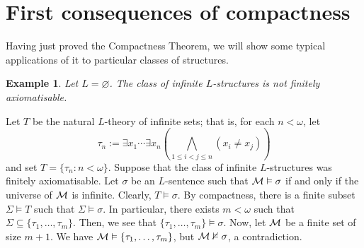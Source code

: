 \documentclass[10pt]{article}
\makeatletter
\theoremstyle{newstyle}
\newtheorem{exmp}[thm]{Example}
\newenvironment{pf}[1][\proofname]{\par
  \pushQED{\qed}%
  \normalfont \topsep0\p@\relax
  \trivlist
  \item[\hskip\labelsep\scshape
  #1\@addpunct{.}]\ignorespaces
}{%
  \popQED\endtrivlist\@endpefalse
}
\makeatother
\begin{document}
\newpage
\section{First consequences of compactness}

Having just proved the Compactness Theorem, we will show some typical applications of it to 
particular classes of structures. 

\begin{exmp}
Let $L = \varnothing$. The class of infinite $L$-structures is not finitely axiomatisable. 
\end{exmp}
\begin{pf}
Let $T$ be the natural $L$-theory of infinite sets; that is, for each $n < \omega$, let 
\[ \tau_n := \exists x_1 \cdots \exists x_n \left( \bigwedge_{1 \leq i < j \leq n} (x_i \neq x_j) 
\right) \] 
and set $T = \{\tau_n : n < \omega\}$. Suppose that the class of infinite $L$-structures 
was finitely axiomatisable. Let $\sigma$ be an $L$-sentence such that ${\cal M} \vDash \sigma$ 
if and only if the universe of ${\cal M}$ is infinite. Clearly, $T \vDash \sigma$. 
By compactness, there is a finite subset $\Sigma \vDash T$ such that $\Sigma \vDash \sigma$. 
In particular, there exists $m < \omega$ such that $\Sigma \subseteq \{\tau_1, \dots, 
\tau_m\}$. Then, we see that $\{\tau_1, \dots, \tau_m\} \vDash \sigma$. Now, let ${\cal M}$ 
be a finite set of size $m + 1$. We have ${\cal M} \vDash \{\tau_1, \dots, \tau_m\}$, 
but ${\cal M} \nvDash \sigma$, a contradiction.
\end{pf}
\end{document}

